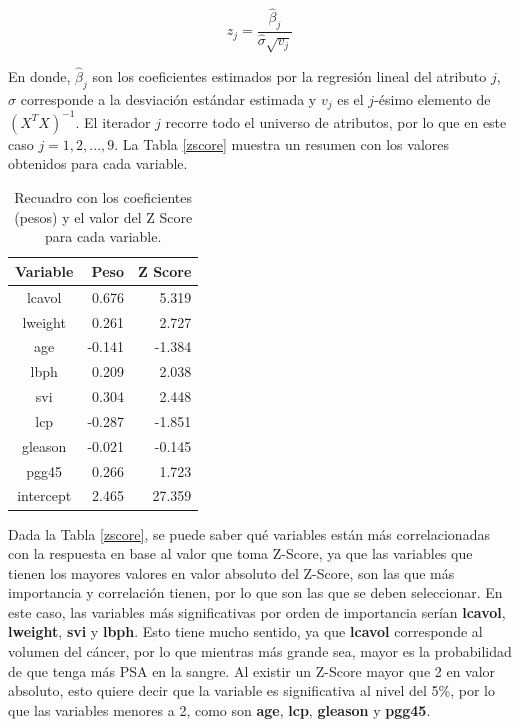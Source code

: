 \documentclass[letter, 10pt]{article}
\begin{document}
\begin{equation}
z_j=\frac{\hat{\beta}_j}{\hat{\sigma }\sqrt{v_j}}
\end{equation}

En donde, $\hat{\beta }_j$ son los coeficientes estimados por la regresión lineal del atributo $j$, $\hat{\sigma }$ corresponde a la desviación estándar estimada y $v_j$ es el $j$-ésimo elemento de $\left ( X^{T}X \right )^{-1}$. El iterador $j$ recorre todo el universo de atributos, por lo que en este caso $j=1,2,...,9$. La Tabla \ref{zscore} muestra un resumen con los valores obtenidos para cada variable.

\begin{table}[!hbt] 
\begin{center}
\begin{tabular}{| c | r | r |} 
\hline
\textbf{Variable} & \textbf{Peso} & \textbf{Z Score}\\ 
\hline 
lcavol & 0.676 & 5.319\\ 
lweight &0.261 & 2.727\\
age &-0.141 & -1.384\\
lbph &0.209 & 2.038\\
svi & 0.304& 2.448\\
lcp & -0.287& -1.851\\
gleason & -0.021& -0.145\\
pgg45 &0.266 &  1.723\\
intercept &2.465 & 27.359\\
\hline 
\end{tabular}
\caption{Recuadro con los coeficientes (pesos) y el valor del Z Score para cada variable.} 
\label{table:zscore}
\end{center} 
\end{table}

Dada la Tabla \ref{zscore}, se puede saber qué variables están más correlacionadas con la respuesta en base al valor que toma Z-Score, ya que las variables que tienen los mayores valores en valor absoluto del Z-Score, son las que más importancia y correlación tienen, por lo que son las que se deben seleccionar. En este caso, las variables más significativas por orden de importancia serían \textbf{lcavol}, \textbf{lweight}, \textbf{svi} y \textbf{lbph}. Esto tiene mucho sentido, ya que \textbf{lcavol} corresponde al volumen del cáncer, por lo que mientras más grande sea, mayor es la probabilidad de que tenga más PSA en la sangre. Al existir un Z-Score mayor que 2 en valor absoluto, esto quiere decir que la variable es significativa al nivel del 5\%, por lo que las variables menores a 2, como son \textbf{age}, \textbf{lcp}, \textbf{gleason} y \textbf{pgg45}.\\
\end{document}
